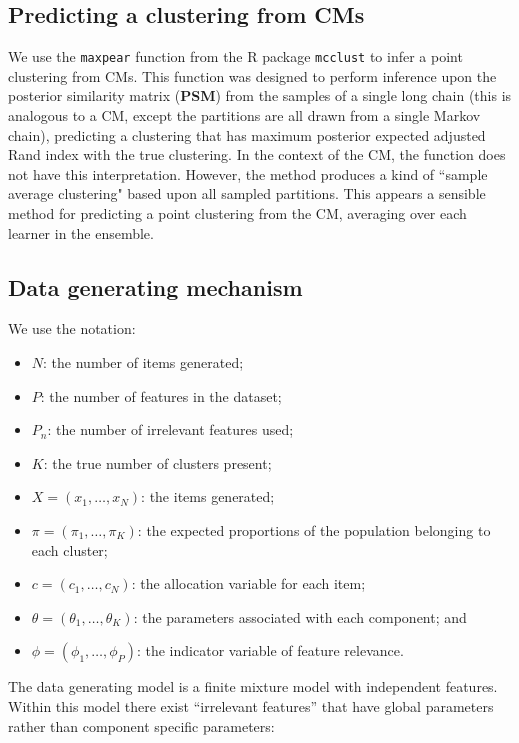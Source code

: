 \documentclass{bioinfo}
\begin{document}
\begin{methods}
\subsection{Predicting a clustering from CMs}
We use the \texttt{maxpear} function \cite{fritsch2009improved} from the R package \texttt{mcclust} \cite{fritsch2012mcclust} to infer a point clustering from CMs. This function was designed to perform inference upon the posterior similarity matrix (\textbf{PSM}) from the samples of a single long chain (this is analogous to a CM, except the partitions are all drawn from a single Markov chain), predicting a clustering that has maximum posterior expected adjusted Rand index \cite{hubert1985comparing} with the true clustering. In the context of the CM, the function does not have this interpretation. However, the method produces a kind of ``sample average clustering" based upon all sampled partitions. This appears a sensible method for predicting a point clustering from the CM, averaging over each learner in the ensemble.

\subsection{Data generating mechanism}
We use the notation:

\begin{itemize}
	\item
	\(N\): the number of items generated;
	\item
	\(P\): the number of features in the dataset;
	\item
	\(P_n\): the number of irrelevant features used;
	\item
	\(K\): the true number of clusters present;
	\item
	\(X = (x_1, \ldots, x_N)\): the items generated;
	\item
	\(\pi=(\pi_1, \ldots, \pi_K)\): the expected proportions of the population belonging to each cluster;
	\item
	\(c=(c_1, \ldots, c_N)\): the allocation variable for each item;
	\item
	\(\theta=(\theta_1, \ldots, \theta_K)\): the parameters associated with each component; and
	\item
	\(\phi=(\phi_1,\ldots, \phi_P)\): the indicator variable of feature relevance.
\end{itemize}

The data generating model is a finite mixture model with independent features. Within this model there exist ``irrelevant features'' \citep{law2003feature} that have global parameters rather than component specific parameters:



\end{methods}
\end{document}
